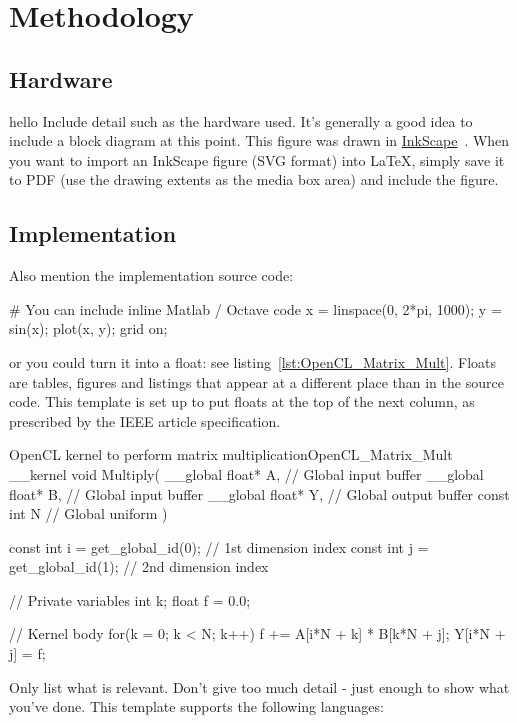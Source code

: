 \section{Methodology}

\subsection{Hardware}
hello Include detail such as the hardware used.  It's generally a good idea to include a block diagram at this point.  This figure was drawn in \href{http://www.inkscape.org/}{InkScape}~\cite{InkScape}.  When you want to import an InkScape figure (SVG format) into \LaTeX{}, simply save it to PDF (use the drawing extents as the media box area) and include the figure.

\subsection{Implementation}
Also mention the implementation source code:

\begin{Matlab}
# You can include inline Matlab / Octave code
x = linspace(0, 2*pi, 1000);
y = sin(x);
plot(x, y); grid on;
\end{Matlab}

or you could turn it into a float: see listing~\ref{lst:OpenCL_Matrix_Mult}.  Floats are tables, figures and listings that appear at a different place than in the source code.  This template is set up to put floats at the top of the next column, as prescribed by the IEEE article specification.

\begin{OpenCL_float}{OpenCL kernel to perform matrix multiplication}{OpenCL_Matrix_Mult}
__kernel void Multiply(
 __global float* A, // Global input buffer
 __global float* B, // Global input buffer
 __global float* Y, // Global output buffer
   const  int    N  // Global uniform
){
 const int i = get_global_id(0); // 1st dimension index
 const int j = get_global_id(1); // 2nd dimension index

 // Private variables
 int   k;
 float f = 0.0;

 // Kernel body
 for(k = 0; k < N; k++) f += A[i*N + k] * B[k*N + j];
 Y[i*N + j] = f;
}
\end{OpenCL_float}

Only list what is relevant.  Don't give too much detail - just enough to show what you've done.  This template supports the following languages:

